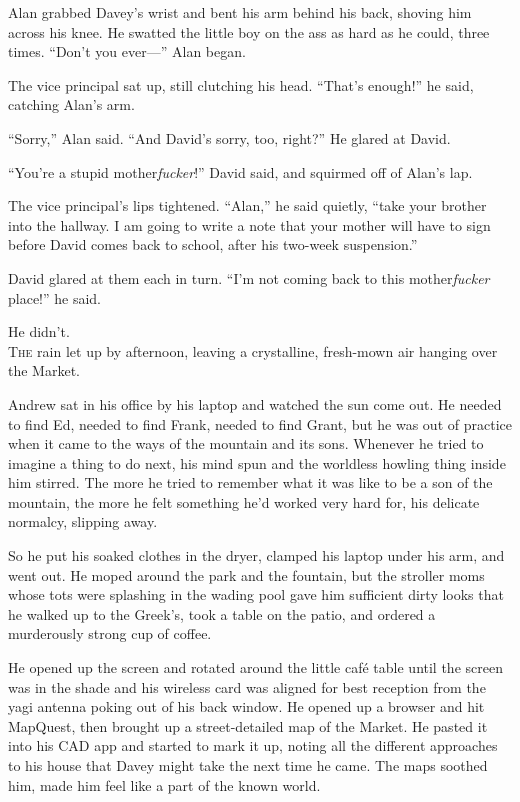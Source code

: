 Alan grabbed Davey's wrist and bent his arm behind his back, shoving
him across his knee.  He swatted the little boy on the ass as hard as
he could, three times.  ``Don't you ever---'' Alan began.

The vice principal sat up, still clutching his head.  ``That's
enough!'' he said, catching Alan's arm.

``Sorry,'' Alan said.  ``And David's sorry, too, right?'' He glared at
David.

``You're a stupid mother\textit{fucker}!'' David said, and squirmed
off of Alan's lap.

The vice principal's lips tightened.  ``Alan,'' he said quietly,
``take your brother into the hallway.  I am going to write a note that
your mother will have to sign before David comes back to school, after
his two-week suspension.''

David glared at them each in turn.  ``I'm not coming back to this
mother\textit{fucker} place!'' he said.

He didn't.
\\
\lettrine[lines=3, lhang=.5, nindent=0pt, findent=2pt]{T}{he} rain let up by afternoon, leaving a crystalline, fresh-mown air
hanging over the Market.

Andrew sat in his office by his laptop and watched the sun come out. 
He needed to find Ed, needed to find Frank, needed to find Grant, but
he was out of practice when it came to the ways of the mountain and
its sons.  Whenever he tried to imagine a thing to do next, his mind
spun and the worldless howling thing inside him stirred.  The more he
tried to remember what it was like to be a son of the mountain, the
more he felt something he'd worked very hard for, his delicate
normalcy, slipping away.

So he put his soaked clothes in the dryer, clamped his laptop under
his arm, and went out.  He moped around the park and the fountain, but
the stroller moms whose tots were splashing in the wading pool gave
him sufficient dirty looks that he walked up to the Greek's, took a
table on the patio, and ordered a murderously strong cup of coffee.

He opened up the screen and rotated around the little caf\'{e} table
until the screen was in the shade and his wireless card was aligned
for best reception from the yagi antenna poking out of his back
window.  He opened up a browser and hit MapQuest, then brought up a
street-detailed map of the Market.  He pasted it into his CAD app and
started to mark it up, noting all the different approaches to his
house that Davey might take the next time he came.  The maps soothed
him, made him feel like a part of the known world.

